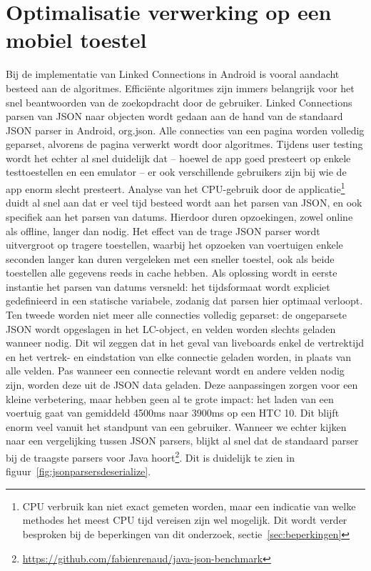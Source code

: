 \section{Optimalisatie verwerking op een mobiel toestel}
Bij de implementatie van Linked Connections in Android is vooral aandacht besteed aan de algoritmes. Efficiënte algoritmes zijn immers belangrijk voor het snel beantwoorden van de zoekopdracht door de gebruiker. Linked Connections parsen van JSON naar objecten wordt gedaan aan de hand van de standaard JSON parser in Android, org.json. Alle connecties van een pagina worden volledig geparset, alvorens de pagina verwerkt wordt door algoritmes. 
Tijdens user testing wordt het echter al snel duidelijk dat -- hoewel de app goed presteert op enkele testtoestellen en een emulator -- er ook verschillende gebruikers zijn bij wie de app enorm slecht presteert. Analyse van het CPU-gebruik door de applicatie\footnote{CPU verbruik kan niet exact gemeten worden, maar een indicatie van welke methodes het meest CPU tijd vereisen zijn wel mogelijk. Dit wordt verder besproken bij de beperkingen van dit onderzoek, sectie~\ref{sec:beperkingen}} duidt al snel aan dat er veel tijd besteed wordt aan het parsen van JSON, en ook specifiek aan het parsen van datums. Hierdoor duren opzoekingen, zowel online als offline, langer dan nodig. Het effect van de trage JSON parser wordt uitvergroot op tragere toestellen, waarbij het opzoeken van voertuigen enkele seconden langer kan duren vergeleken met een sneller toestel, ook als beide toestellen alle gegevens reeds in cache hebben.
Als oplossing wordt in eerste instantie het parsen van datums versneld: het tijdsformaat wordt expliciet gedefinieerd in een statische variabele, zodanig dat parsen hier optimaal verloopt. Ten tweede worden niet meer alle connecties volledig geparset: de ongeparsete JSON wordt opgeslagen in het LC-object, en velden worden slechts geladen wanneer nodig. Dit wil zeggen dat in het geval van liveboards enkel de vertrektijd en het vertrek- en eindstation van elke connectie geladen worden, in plaats van alle velden. Pas wanneer een connectie relevant wordt en andere velden nodig zijn, worden deze uit de JSON data geladen.
Deze aanpassingen zorgen voor een kleine verbetering, maar hebben geen al te grote impact: het laden van een voertuig gaat van gemiddeld 4500ms naar 3900ms op een HTC 10. Dit blijft enorm veel vanuit het standpunt van een gebruiker.
Wanneer we echter kijken naar een vergelijking tussen JSON parsers, blijkt al snel dat de standaard  parser bij de traagste parsers voor Java hoort\footnote{\url{https://github.com/fabienrenaud/java-json-benchmark}}. Dit is duidelijk te zien in figuur~\ref{fig:jsonparsersdeserialize}.

